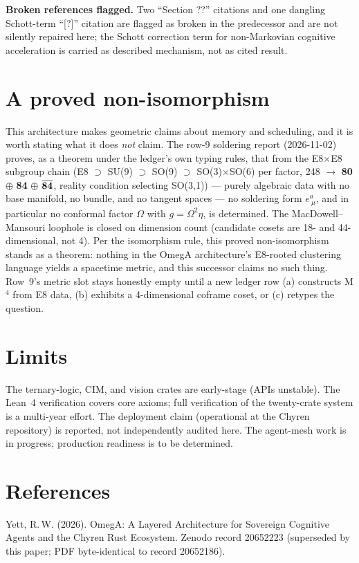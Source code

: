 \documentclass{alienfolio}
\begin{document}
\textbf{Broken references flagged.} Two ``Section ??'' citations and one
dangling Schott-term ``[?]'' citation are flagged as broken in the
predecessor and are not silently repaired here; the Schott correction term
for non-Markovian cognitive acceleration is carried as described mechanism,
not as cited result.

\section{A proved non-isomorphism}
This architecture makes geometric claims about memory and scheduling, and it
is worth stating what it does \emph{not} claim. The row-9 soldering report
(2026-11-02) proves, as a theorem under the ledger's own typing rules, that
from the E8$\times$E8 subgroup chain (E8 $\supset$ SU(9) $\supset$ SO(9)
$\supset$ SO(3)$\times$SO(6) per factor, 248 $\to$ {\bf 80} $\oplus$ {\bf 84}
$\oplus$ $\overline{{\bf 84}}$, reality condition selecting SO(3,1)) ---
purely algebraic data with no base manifold, no bundle, and no tangent
spaces --- no soldering form $e^a_{\ \mu}$, and in particular no conformal
factor $\Omega$ with $g = \Omega^2 \eta$, is determined. The MacDowell--Mansouri
loophole is closed on dimension count (candidate cosets are 18- and
44-dimensional, not 4).  Per the isomorphism rule, this
proved non-isomorphism stands as a theorem: nothing in the OmegA
architecture's E8-rooted clustering language yields a spacetime metric, and
this successor claims no such thing. Row~9's metric slot stays honestly
empty until a new ledger row (a) constructs M$^4$ from E8 data, (b) exhibits
a 4-dimensional coframe coset, or (c) retypes the question.

\section{Limits}
The ternary-logic, CIM, and vision crates are early-stage (APIs unstable).
The Lean~4 verification covers core axioms; full verification of the
twenty-crate system is a multi-year effort. The deployment claim (operational
at the Chyren repository) is reported, not independently audited here. The
agent-mesh work is in progress; production readiness is to be determined.

\section*{References}
Yett, R.\,W. (2026). OmegA: A Layered Architecture for Sovereign Cognitive
Agents and the Chyren Rust Ecosystem. Zenodo record 20652223 (superseded by
this paper; PDF byte-identical to record 20652186).
\end{document}
